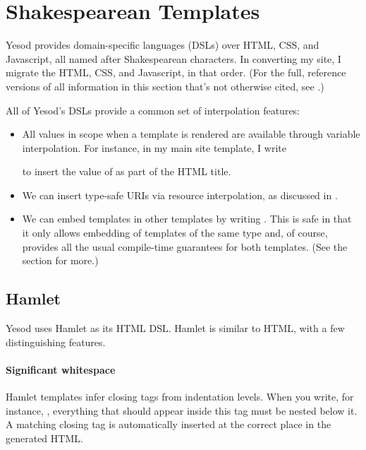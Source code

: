 \section{Shakespearean Templates}

Yesod provides domain-specific languages (DSLs) over HTML, CSS, and Javascript, all named after Shakespearean characters. In converting my site, I migrate the HTML, CSS, and Javascript, in that order. (For the full, reference versions of all information in this section that's not otherwise cited, see \cite{ybkShakes}.)

All of Yesod's DSLs provide a common set of interpolation features:

\begin{itemize}
  \item {} All values in scope when a template is rendered are available through variable interpolation. For instance, in my main site template, I write


    to insert the value of  as part of the HTML title.

  \item {} We can insert type-safe URIs via  resource interpolation, as discussed in .

  \item {} We can embed templates in other templates by writing . This is safe in that it only allows embedding of templates of the same type and, of course, provides all the usual compile-time guarantees for both templates. (See the  section for more.)
\end{itemize}

\subsection{Hamlet}

Yesod uses Hamlet as its HTML DSL. Hamlet is similar to HTML, with a few distinguishing features.

\paragraph{Significant whitespace} Hamlet templates infer closing tags from indentation levels. When you write, for instance, , everything that should appear inside this tag must be nested below it. A matching closing tag is automatically inserted at the correct place in the generated HTML. 

